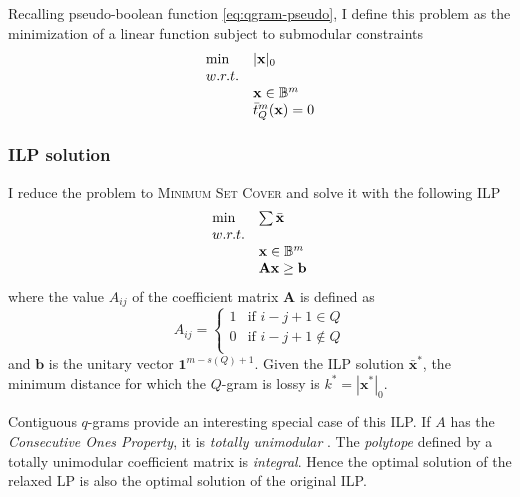 Recalling pseudo-boolean function \ref{eq:qgram-pseudo}, I define this problem as the minimization of a linear function subject to submodular constraints
\begin{equation}
\begin{array}{ll}
\text{min} & |\mathbf{x}|_0			\\
w.r.t.								\\
& \mathbf{x} \in \mathbb {B}^m					\\
& \bar{t}_{Q}^{m}(\mathbf{x}) = 0	\\
\end{array}
\end{equation}

\subsubsection{ILP solution}

I reduce the problem to \textsc{Minimum Set Cover} \citep{Vazirani2001} and solve it with the following ILP
\begin{equation}
\begin{array}{ll}
\text{min} & \sum \bar{\mathbf{x}}	\\
w.r.t.						\\
& \mathbf{x} \in \mathbb {B}^m			\\
& \mathbf{A}\mathbf{x} \geq \mathbf{b}	\\
\end{array}
\end{equation}
where the value $A_{ij}$ of the coefficient matrix $\mathbf{A}$ is defined as
\begin{equation}
A_{ij} = 
\left\{
	\begin{array}{ll}
		1  & \mbox{if } i-j+1 \in Q		\\
		0  & \mbox{if } i-j+1 \notin Q	\\
	\end{array}
\right.
\end{equation}
and $\mathbf{b}$ is the unitary vector $\mathbf{1}^{m - s(Q) + 1}$.
Given the ILP solution $\bar{\mathbf{x}}^*$, the minimum distance for which the $Q$-gram is lossy is $k^* = |\mathbf{x}^*|_0$.

\begin{observation}
Contiguous $q$-grams provide an interesting special case of this ILP.
If $A$ has the \emph{Consecutive Ones Property}, it is \emph{totally unimodular} \citep{Fulkerson1964}.
The \emph{polytope} defined by a totally unimodular coefficient matrix is \emph{integral}.
Hence the optimal solution of the relaxed LP is also the optimal solution of the original ILP.
\end{observation}

